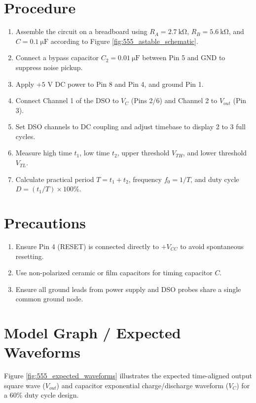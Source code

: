 \section{Procedure}
\begin{enumerate}
	\item Assemble the circuit on a breadboard using $R_A = \SI{2.7}{\kilo\ohm}$, $R_B = \SI{5.6}{\kilo\ohm}$, and $C = \SI{0.1}{\micro\farad}$ according to Figure \ref{fig:555_astable_schematic}.
	\item Connect a bypass capacitor $C_2 = \SI{0.01}{\micro\farad}$ between Pin 5 and GND to suppress noise pickup.
	\item Apply $+5\text{ V}$ DC power to Pin 8 and Pin 4, and ground Pin 1.
	\item Connect Channel 1 of the DSO to $V_C$ (Pins 2/6) and Channel 2 to $V_{out}$ (Pin 3).
	\item Set DSO channels to DC coupling and adjust timebase to display 2 to 3 full cycles.
	\item Measure high time $t_1$, low time $t_2$, upper threshold $V_{TH}$, and lower threshold $V_{TL}$.
	\item Calculate practical period $T = t_1 + t_2$, frequency $f_0 = 1/T$, and duty cycle $D = (t_1/T) \times 100\%$.
\end{enumerate}

\section{Precautions}
\begin{enumerate}
	\item Ensure Pin 4 (RESET) is connected directly to $+V_{CC}$ to avoid spontaneous resetting.
	\item Use non-polarized ceramic or film capacitors for timing capacitor $C$.
	\item Ensure all ground leads from power supply and DSO probes share a single common ground node.
\end{enumerate}

\section{Model Graph / Expected Waveforms}
Figure \ref{fig:555_expected_waveforms} illustrates the expected time-aligned output square wave ($V_{out}$) and capacitor exponential charge/discharge waveform ($V_C$) for a $60\%$ duty cycle design.

